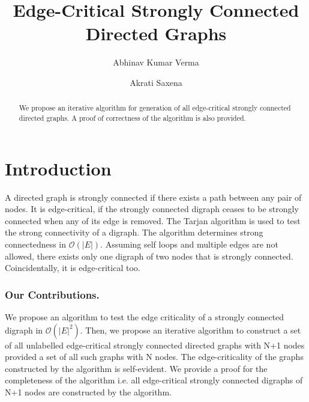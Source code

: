 \documentclass[runningheads]{llncs}
\begin{document}
%
\title{Edge-Critical Strongly Connected Directed Graphs}
%
%
\author{Abhinav Kumar Verma \and
Akrati Saxena}
%
%
%
\maketitle              %
%
\begin{abstract}
We propose an iterative algorithm for generation of all edge-critical strongly connected directed graphs. A proof of correctness of the algorithm is also provided.

\end{abstract}
%
%
%
\section{Introduction}
A directed graph is strongly connected if there exists a path between any pair of nodes. It is edge-critical, if the strongly connected digraph ceases to be strongly connected when any of its edge is removed. The Tarjan algorithm is used to test the strong connectivity of a digraph. The algorithm determines strong connectedness in $\mathcal{O}(|E|)$. Assuming self loops and multiple edges are not allowed, there exists only one digraph of two nodes that is strongly connected. Coincidentally, it is edge-critical too.


\subsubsection{Our Contributions.} We propose an algorithm to test the edge criticality of a strongly connected digraph in $\mathcal{O}(|E|^2)$. Then, we propose an iterative algorithm to construct a set of all unlabelled edge-critical strongly connected directed graphs with N+1 nodes provided a set of all such graphs with N nodes. The edge-criticality of the graphs constructed by the algorithm is self-evident. We provide a proof for the completeness of the algorithm i.e. all edge-critical strongly connected digraphs of N+1 nodes are constructed by the algorithm.
\end{document}

